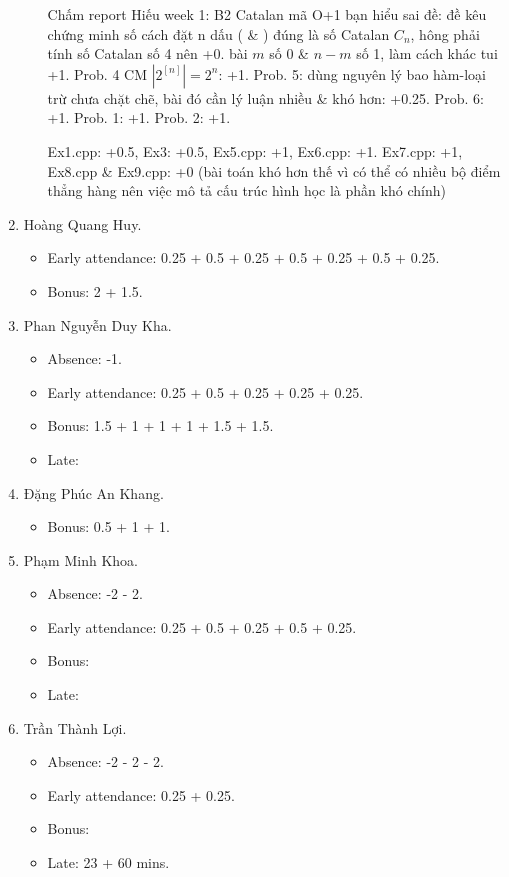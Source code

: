 \documentclass{article}
\begin{document}
\begin{enumerate}
\begin{itemize}
		Chấm report Hiếu week 1: B2 Catalan mã O+1 bạn hiểu sai đề: đề kêu chứng minh số cách đặt n dấu ( \& ) đúng là số Catalan $C_n$, hông phải tính số Catalan số 4 nên +0. bài $m$ số 0 \& $n - m$ số 1, làm cách khác tui +1. Prob. 4 CM $|2^[n]| =2^n$: +1. Prob. 5: dùng nguyên lý bao hàm-loại trừ chưa chặt chẽ, bài đó cần lý luận nhiều \& khó hơn: +0.25. Prob. 6: +1. Prob. 1: +1. Prob. 2: +1.
		
		Ex1.cpp: +0.5, Ex3: +0.5, Ex5.cpp: +1, Ex6.cpp: +1. Ex7.cpp: +1, Ex8.cpp \& Ex9.cpp: +0 (bài toán khó hơn thế vì có thể có nhiều bộ điểm thẳng hàng nên việc mô tả cấu trúc hình học là phần khó chính)
	\end{itemize}
	\item {\sc Hoàng Quang Huy.}
	\begin{itemize}
		\item Early attendance: 0.25 + 0.5 + 0.25 + 0.5 + 0.25 + 0.5 + 0.25.
		\item Bonus: 2 + 1.5.
	\end{itemize}
	\item {\sc Phan Nguyễn Duy Kha.}
	\begin{itemize}
		\item Absence: -1.
		\item Early attendance: 0.25 + 0.5 + 0.25 + 0.25 + 0.25.
		\item Bonus: 1.5 + 1 + 1 + 1 + 1.5 + 1.5.
		\item Late: 
	\end{itemize}
	\item {\sc Đặng Phúc An Khang.}
	\begin{itemize}
		\item Bonus: 0.5 + 1 + 1.
	\end{itemize}
	\item {\sc Phạm Minh Khoa.}
	\begin{itemize}
		\item Absence: -2 - 2.
		\item Early attendance: 0.25 + 0.5 + 0.25 + 0.5 + 0.25.
		\item Bonus:
		\item Late: 
	\end{itemize}
	\item {\sc Trần Thành Lợi.}
	\begin{itemize}
		\item Absence: -2 - 2 - 2.
		\item Early attendance: 0.25 + 0.25.
		\item Bonus: 
		\item Late: 23 + 60 mins.

\end{itemize}
\end{enumerate}
\end{document}
